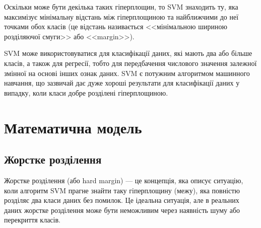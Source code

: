 \documentclass[]{article}
\begin{document}
Оскільки може бути декілька таких гіперплощин, то SVM знаходить ту, яка максимізує мінімальну відстань між гіперплощиною та найближчими до неї точками обох класів (це відстань називається <<мінімальною шириною розділяючої смуги>> або <<margin>>).

SVM може використовуватися для класифікації даних, які мають два або більше класів, а також для регресії, тобто для передбачення числового значення залежної змінної на основі інших ознак даних. SVM є потужним алгоритмом машинного навчання, що зазвичай дає дуже хороші результати для класифікації даних у випадку, коли класи добре розділені гіперплощиною.

\section{Математична модель}

\subsection{Жорстке розділення}

Жорстке розділення (або hard margin) --- це концепція, яка описує ситуацію, коли алгоритм SVM прагне знайти таку гіперплощину (межу), яка повністю розділяє два класи даних без помилок. Це ідеальна ситуація, але в реальних даних жорстке розділення може бути неможливим через наявність шуму або перекриття класів.
\end{document}
